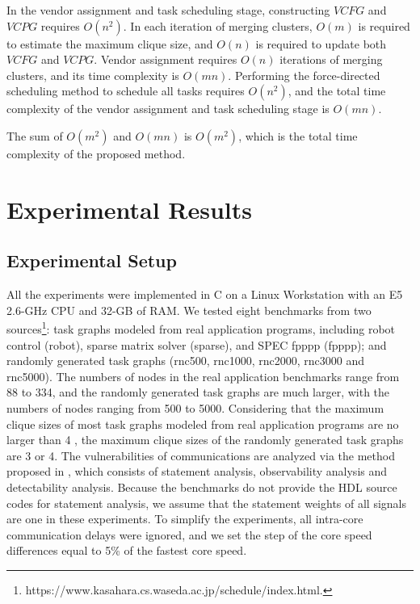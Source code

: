 \documentclass[10pt,journal, compsoc]{IEEEtran}
\begin{document}
In the vendor assignment and task scheduling stage, constructing $VCFG$ and $VCPG$ requires $O(n^2)$. In each iteration of merging clusters, $O(m)$ is required to estimate the maximum clique size, and $O(n)$ is required to update both $VCFG$ and $VCPG$. Vendor assignment requires $O(n)$ iterations of merging clusters, and its time complexity is $O(mn)$. Performing the force-directed scheduling method to schedule all tasks requires $O(n^2)$, and the total time complexity of the vendor assignment and task scheduling stage is $O(mn)$.

The sum of $O(m^2)$ and $O(mn)$ is $O(m^2)$, which is the total time complexity of the proposed method.










\section{Experimental Results}



\subsection{Experimental Setup}

All the experiments were implemented in C on a Linux Workstation with an E5 2.6-GHz CPU and 32-GB of RAM. We tested eight benchmarks from two sources\footnote{https://www.kasahara.cs.waseda.ac.jp/schedule/index.html.}: task graphs modeled from real application programs, including robot control (robot), sparse matrix solver (sparse), and SPEC fpppp (fpppp); and randomly generated task graphs (rnc500, rnc1000, rnc2000, rnc3000 and rnc5000). The numbers of nodes in the real application benchmarks range from 88 to 334, and the randomly generated task graphs are much larger, with the numbers of nodes ranging from 500 to 5000. Considering that the maximum clique sizes of most task graphs modeled from real application programs are no larger than 4 \cite{article:CL}, the maximum clique sizes of the randomly generated task graphs are 3 or 4. The vulnerabilities of communications are analyzed via the method proposed in \cite{conference:HS}, which consists of statement analysis, observability analysis and detectability analysis. Because the benchmarks do not provide the HDL source codes for statement analysis, we assume that the statement weights of all signals are one in these experiments. To simplify the experiments, all intra-core communication delays were ignored, and we set the step of the core speed differences equal to 5\% of the fastest core speed.
\end{document}
